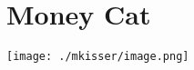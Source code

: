 \documentclass[../mainfile.tex]{subfiles}
\begin{document}
\section{Money Cat}
\texttt{[image: ./mkisser/image.png]}
\end{document}
